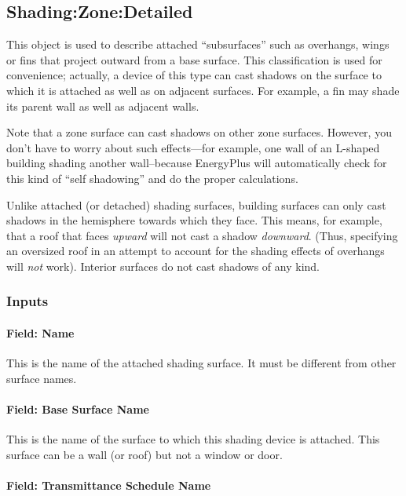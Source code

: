 \subsection{Shading:Zone:Detailed}\label{shadingzonedetailed-000}

This object is used to describe attached ``subsurfaces'' such as overhangs, wings or fins that project outward from a base surface. This classification is used for convenience; actually, a device of this type can cast shadows on the surface to which it is attached as well as on adjacent surfaces. For example, a fin may shade its parent wall as well as adjacent walls.

Note that a zone surface can cast shadows on other zone surfaces. However, you don't have to worry about such effects---for example, one wall of an L-shaped building shading another wall--because EnergyPlus will automatically check for this kind of ``self shadowing'' and do the proper calculations.

Unlike attached (or detached) shading surfaces, building surfaces can only cast shadows in the hemisphere towards which they face. This means, for example, that a roof that faces \emph{upward} will not cast a shadow \emph{downward}. (Thus, specifying an oversized roof in an attempt to account for the shading effects of overhangs will \emph{not} work). Interior surfaces do not cast shadows of any kind.

\subsubsection{Inputs}\label{inputs-30-002}

\paragraph{Field: Name}\label{field-name-28-002}

This is the name of the attached shading surface. It must be different from other surface names.

\paragraph{Field: Base Surface Name}\label{field-base-surface-name}

This is the name of the surface to which this shading device is attached. This surface can be a wall (or roof) but not a window or door.

\paragraph{Field: Transmittance Schedule Name}\label{field-transmittance-schedule-name-1}


